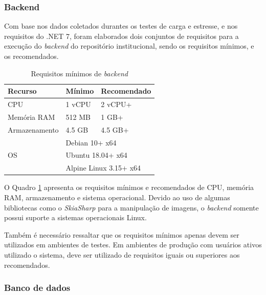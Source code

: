 \subsubsection{Backend}

Com base nos dados coletados durantes os testes de carga e estresse,
e nos requisitos do .NET 7, foram elaborados dois conjuntos de requisitos
para a execução do \emph{backend} do repositório institucional, sendo os
requisitos mínimos, e os recomendados.

\begin{table}[H]
    \caption{Requisitos mínimos de \emph{backend}}
    \label{quad:requisitos-backend}
    \begin{tabular}{|p{9.5cm}|ll|}
        \hline
        \textbf{Recurso}    & \multicolumn{1}{l|}{\textbf{Mínimo}}        & \textbf{Recomendado} \\ \hline
        CPU                 & \multicolumn{1}{l|}{1 vCPU}                 & 2 vCPU+              \\ \hline
        Memória RAM         & \multicolumn{1}{l|}{512 MB}                 & 1 GB+                \\ \hline
        Armazenamento       & \multicolumn{1}{l|}{4.5 GB}                 & 4.5 GB+              \\ \hline
        \multirow{3}{*}{OS} & \multicolumn{2}{l|}{Debian 10+ x64}                                \\ \cline{2-3}
                            & \multicolumn{2}{l|}{Ubuntu 18.04+ x64}                             \\ \cline{2-3}
                            & \multicolumn{2}{l|}{Alpine Linux 3.15+ x64}                        \\ \hline
    \end{tabular}
\end{table}

O Quadro \ref{quad:requisitos-backend} apresenta os requisitos mínimos e recomendados de
CPU, memória RAM, armazenamento e sistema operacional. Devido ao uso de algumas bibliotecas
como o \emph{SkiaSharp} para a manipulação de imagens, o \emph{backend} somente possui
suporte a sistemas operacionais Linux.

Também é necessário ressaltar que os requisitos mínimos apenas devem ser utilizados
em ambientes de testes. Em ambientes de produção com usuários ativos utilizado
o sistema, deve ser utilizado de requisitos iguais ou superiores aos recomendados.

\subsubsection{Banco de dados}


